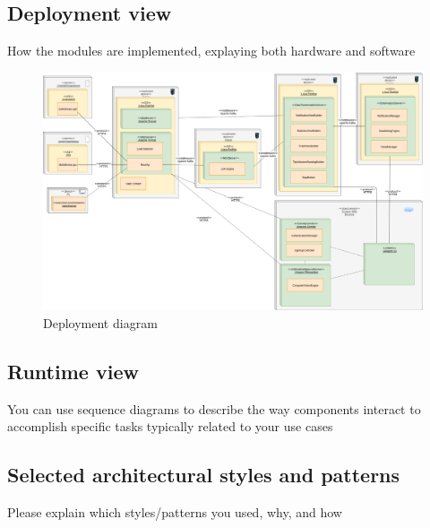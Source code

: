 \documentclass{article}
\begin{document}
	\subsection{Deployment view} How the modules are implemented, explaying both hardware and software
	\begin{figure}[H]
		\includegraphics[width=\linewidth]{images/Deployment_diagram.png}
		\caption{Deployment diagram}
	\end{figure}
	\subsection{Runtime view}	You	can	use	sequence	diagrams	to	describe	the	way	components	interact	
to	accomplish	specific	tasks	typically	related	to	your	use	cases
	\subsection{Selected architectural styles and patterns} Please	explain	which	styles/patterns	you	used,	
why,	and	how
\end{document}
